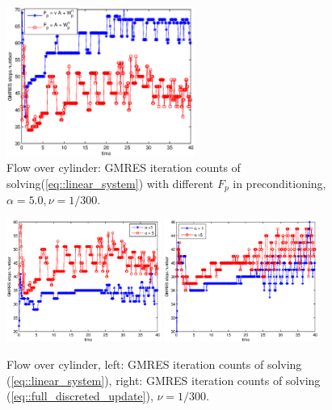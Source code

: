 \documentclass{eajam}
\begin{document}
      \begin{figure}[!htbp]
        \begin{center}
          \includegraphics[width = 0.55\textwidth]{picture/obstacle_flow_data/comparation_NS_iterate_step.eps}
        \end{center}
        \caption{\small Flow over cylinder: GMRES iteration counts of
                 solving(\ref{eq::linear_system}) with different $F_p$ in
                 preconditioning, $\alpha = 5.0, \nu = 1/300$.}
        \label{fig::cylinder_GMRES_steps_comparation}
      \end{figure}
      
      \begin{figure}[!htbp]
        \begin{center}
          \includegraphics[width = 0.45\textwidth]{picture/obstacle_flow_data/NS_iterate_steps.eps}
          \includegraphics[width = 0.45\textwidth]{picture/obstacle_flow_data/moving_iterate_steps.eps}
        \end{center}
        \caption{\small Flow over cylinder, left: GMRES iteration counts of
          solving (\ref{eq::linear_system}), right: GMRES iteration
          counts of solving (\ref{eq::full_discreted_update}), $\nu =
          1/300$.}
        \label{fig::cylinder_GMRES_steps}
      \end{figure}
      
\end{document}
